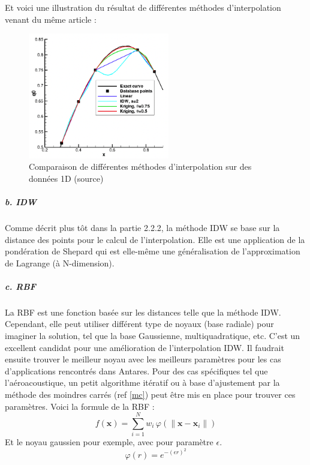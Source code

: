 Et voici une illustration du résultat de différentes méthodes d'interpolation venant du même article :

\begin{figure}[H]
    \centering
    \includegraphics[width=0.55\textwidth]{images/palmer2009_comp_copie.png}
    \caption{Comparaison de différentes méthodes d'interpolation sur des données 1D (source\cite{palmer2009})}
    \label{fig:compar}
\end{figure}

\subparagraph{b. IDW}
Comme décrit plus tôt dans la partie 2.2.2, la méthode IDW se base sur la distance des points pour le calcul de l'interpolation. Elle est une application de la pondération de Shepard qui est elle-même une généralisation de l'approximation de Lagrange (à N-dimension).

\subparagraph{c. RBF}
La \ac{RBF} est une fonction basée sur les distances telle que la méthode IDW. Cependant, elle peut utiliser différent type de noyaux (base radiale) pour imaginer la solution, tel que la base Gaussienne, multiquadratique, etc. C'est un excellent candidat pour une amélioration de l'interpolation IDW. Il faudrait ensuite trouver le meilleur noyau avec les meilleurs paramètres pour les cas d'applications rencontrés dans Antares. Pour des cas spécifiques tel que l'aéroacoustique, un petit algorithme itératif ou à base d'ajustement par la méthode des moindres carrés (ref \ref{mc}) peut être mis en place pour trouver ces paramètres.
Voici la formule de la RBF :
\[
f(\mathbf{x}) = \sum_{i=1}^{N} w_{i} \, \varphi \left( \|\mathbf{x} - \mathbf{x}_{i}\| \right)
\]
Et le noyau gaussien pour exemple, avec pour paramètre \(\epsilon\).
\[
\varphi(r) = e^{-(\epsilon r)^{2}}
\]



